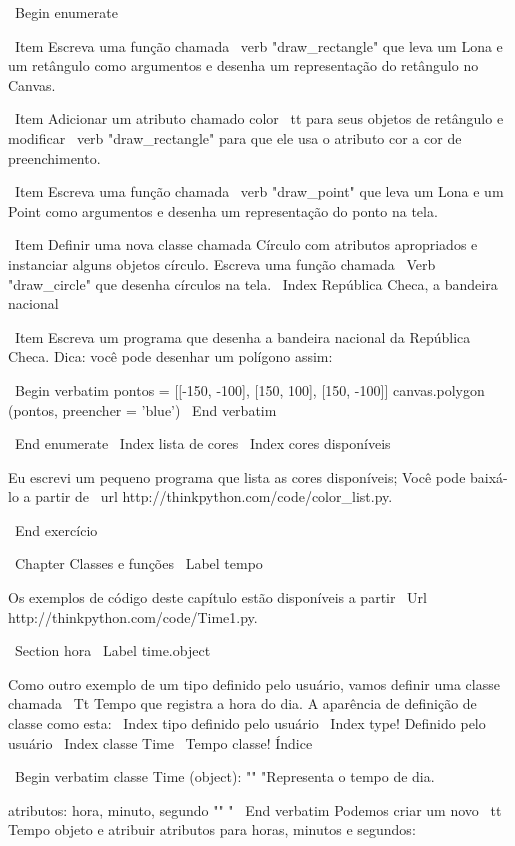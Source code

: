 \documentclass[10pt]{book}
\begin{document}
\begin {itemize}
{{{{{{{{{{{{{\ Begin {enumerate}

\ Item Escreva uma função chamada \ verb "draw_rectangle" que leva um
  Lona e um retângulo como argumentos e desenha um
  representação do retângulo no Canvas.

\ Item Adicionar um atributo chamado {color \ tt} para seus objetos de retângulo e
  modificar \ verb "draw_rectangle" para que ele usa o atributo cor
  a cor de preenchimento.

\ Item Escreva uma função chamada \ verb "draw_point" que leva um
  Lona e um Point como argumentos e desenha um
  representação do ponto na tela.

\ Item Definir uma nova classe chamada Círculo com atributos apropriados e
  instanciar alguns objetos círculo. Escreva uma função chamada
  \ Verb "draw_circle" que desenha círculos na tela.
\ Index {República Checa, a bandeira nacional}

\ Item Escreva um programa que desenha a bandeira nacional da República Checa.
Dica: você pode desenhar um polígono assim:

\ Begin {verbatim}
pontos = [[-150, -100], [150, 100], [150, -100]]
canvas.polygon (pontos, preencher = 'blue')
\ End {verbatim}

\ End {enumerate}
\ Index {lista de cores}
\ Index {cores disponíveis}

Eu escrevi um pequeno programa que lista as cores disponíveis;
Você pode baixá-lo a partir de \ url {http://thinkpython.com/code/color_list.py}.

\ End {} exercício


\ Chapter {Classes e funções}
\ Label {tempo}

Os exemplos de código deste capítulo estão disponíveis a partir
\ Url {http://thinkpython.com/code/Time1.py}.

\ Section {hora}
\ Label {} time.object

Como outro exemplo de um tipo definido pelo usuário, vamos definir uma classe chamada
{\ Tt Tempo} que registra a hora do dia. A aparência de definição de classe
como esta:
\ Index {tipo definido pelo usuário}
\ Index {type! Definido pelo usuário}
\ Index {classe Time}
\ {Tempo classe!} Índice

\ Begin {verbatim}
classe Time (object):
    "" "Representa o tempo de dia.
       
    atributos: hora, minuto, segundo
    "" "
\ End {verbatim}
%
Podemos criar um novo {\ tt Tempo} objeto e atribuir
atributos para horas, minutos e segundos:

}}}}}}}}}}}}}
\end{itemize}
\end{document}

